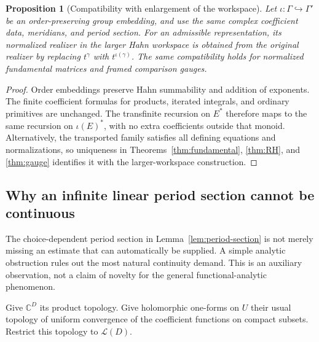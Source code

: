 \documentclass[11pt,letterpaper]{article}
\numberwithin{equation}{section}
\newtheorem{proposition}[theorem]{Proposition}
\theoremstyle{definition}
\theoremstyle{remark}
\newcommand{\C}{\mathbb C}
\newcommand{\LL}{\mathcal L}
\begin{document}
\begin{proposition}[Compatibility with enlargement of the workspace]
\label{prop:base-change}
Let $\iota:\Gamma\hookrightarrow\Gamma'$ be an order-preserving group
embedding, and use the same complex coefficient data, meridians, and period
section. For an admissible representation, its normalized realizer in the
larger Hahn workspace is obtained from the original realizer by replacing
$t^\gamma$ with $t^{\iota(\gamma)}$. The same compatibility holds for
normalized fundamental matrices and framed comparison gauges.
\end{proposition}
\begin{proof}
Order embeddings preserve Hahn summability and addition of exponents.
The finite coefficient formulas for products, iterated integrals, and
ordinary primitives are unchanged. The transfinite recursion on $E^*$
therefore maps to the same recursion on $\iota(E)^*$, with no extra
coefficients outside that monoid. Alternatively, the transported family
satisfies all defining equations and normalizations, so uniqueness in
Theorems~\ref{thm:fundamental}, \ref{thm:RH}, and \ref{thm:gauge} identifies
it with the larger-workspace construction.
\end{proof}

\subsection{Why an infinite linear period section cannot be continuous}
The choice-dependent period section in Lemma~\ref{lem:period-section} is
not merely missing an estimate that can automatically be supplied. A
simple analytic obstruction rules out the most natural continuity demand.
This is an auxiliary observation, not a claim of novelty for the general
functional-analytic phenomenon.

Give $\C^D$ its product topology. Give holomorphic one-forms on $U$ their
usual topology of uniform convergence of the coefficient functions on
compact subsets. Restrict this topology to $\LL(D)$.
\end{document}
